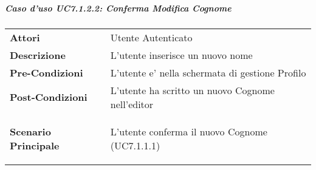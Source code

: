 \subparagraph{Caso d'uso UC7.1.2.2:  Conferma Modifica Cognome}
\label{UC7_1_2_2}

\begin{tabular}{ l | p{11cm}}
	\hline
	\rowcolor{Gray}
	 \multicolumn{2}{c}{UC7.1.2.2:  Conferma Modifica Cognome} \\
	 \hline
	\textbf{Attori} & Utente Autenticato \\
	\textbf{Descrizione} & L'utente inserisce un nuovo nome\\
	\textbf{Pre-Condizioni} & L'utente e' nella schermata di gestione Profilo\\
	\textbf{Post-Condizioni} & L'utente ha scritto un nuovo Cognome nell'editor\\
	\textbf{Scenario Principale} & 
	\begin{enumerate*}[label=(\arabic*.),itemjoin={\newline}]
		\item L'utente conferma il nuovo Cognome (UC7.1.1.1)
	\end{enumerate*}\\
\end{tabular}